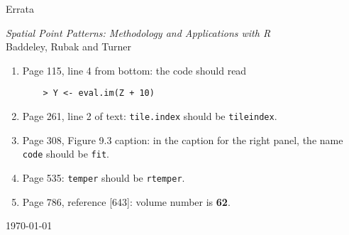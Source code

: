 \documentclass[12pt,a4paper]{article}
\begin{document}
\thispagestyle{empty}
\begin{center}
  \begin{LARGE}
    Errata 
  \end{LARGE}

  \begin{large}
    \emph{Spatial Point Patterns: Methodology and Applications with R}\\
    Baddeley, Rubak and Turner
  \end{large}
\end{center}

\begin{enumerate}
\item Page 115, line 4 from bottom: the code should read
\begin{verbatim}
    > Y <- eval.im(Z + 10)
\end{verbatim}
\item Page 261, line 2 of text: 
\texttt{tile.index} should be \texttt{tileindex}.
\item Page 308, Figure 9.3 caption: in the caption for the right panel,
the name \texttt{code} should be \texttt{fit}.
\item Page 535: \texttt{temper} should be \texttt{rtemper}.
\item Page 786, reference [643]: volume number is \textbf{62}.
\end{enumerate}

\vspace*{\fill}

\hspace*{\fill} \today
\end{document}
